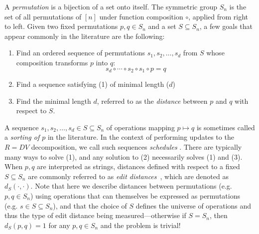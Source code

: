 \documentclass{siamart190516}
\newcommand\sbullet[1][.5]{\mathbin{\vcenter{\hbox{\scalebox{#1}{$\bullet$}}}}}
\begin{document}
 A \emph{permutation}  is a bijection of a set onto itself. The symmetric group $S_n$ is the set of all permutations of  $[n]$ under function composition $\circ$, applied from right to left. Given two fixed permutations $p, q \in S_n$ and a set $S \subseteq S_n$, a few goals that appear commonly in the literature are the following:
\begin{enumerate}
	\item Find an ordered sequence of permutations $s_1, s_2, \dots, s_d$ from $S$ whose composition transforms $p$ into $q$:
	\begin{displaymath}
		s_d \circ \cdots \circ s_2 \circ s_1 \circ p = q
	\end{displaymath}
	\item Find a sequence satisfying (1) of minimal length ($d$)
	\item Find the minimal length $d$, referred to as the \emph{distance} between $p$ and $q$ with respect to $S$. 
\end{enumerate}
A sequence $s_1, s_2, \dots, s_d \in S \subseteq S_n$ of operations mapping $p \mapsto q$ is sometimes called a \emph{sorting of $p$} in the literature. In the context of performing updates to the $R = D V$ decomposition, we call such sequences \emph{schedules} . There are typically many ways to solve (1), and any solution to (2) necessarily solves (1) and (3). When $p, q$ are interpreted as strings, distances defined with respect to a fixed $S \subseteq S_n$ are commonly referred to as \emph{edit distances}~\cite{labarre2013lower}, which are denoted as $d_S(\cdot, \cdot)$. Note that here we describe distances between permutations (e.g. $p,q \in S_n$) using operations that can themselves be expressed as permutations (e.g. $s \in S \subseteq S_n$), and that the choice of $S$ defines the universe of operations and thus the type of edit distance being measured---otherwise if $S = S_n$, then $d_S(p, q) = 1$ for any $p, q \in S_n$ and the problem is trivial!
\end{document}
